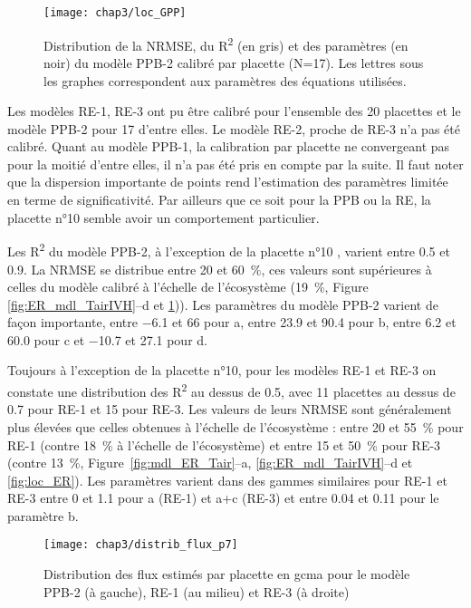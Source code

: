 \begin{figure}
\centering
\texttt{[image: chap3/loc\_GPP]}
\caption{Distribution de la NRMSE, du R\textsuperscript{2} (en gris) et des paramètres (en noir) du modèle PPB-2 calibré par placette (N=17). Les lettres sous les graphes correspondent aux paramètres des équations utilisées.}
\label{fig:loc_GPP}
\end{figure}

Les modèles RE-1, RE-3 ont pu être calibré pour l'ensemble des 20 placettes et le modèle PPB-2 pour 17 d'entre elles.
Le modèle RE-2, proche de RE-3 n'a pas été calibré.
Quant au modèle PPB-1, la calibration par placette ne convergeant pas pour la moitié d'entre elles, il n'a pas été pris en compte par la suite.
Il faut noter que la dispersion importante de points rend l'estimation des paramètres limitée en terme de significativité.
Par ailleurs que ce soit pour la PPB ou la RE, la placette n°10 semble avoir un comportement particulier.


Les R\textsuperscript{2} du modèle PPB-2, à l'exception de la placette n°10 , varient entre \num{0.5} et \num{0.9}.
La NRMSE se distribue entre 20 et \SI{60}{\percent}, ces valeurs sont supérieures à celles du modèle calibré à l'échelle de l'écosystème (\SI{19}{\percent}, Figure~ \ref{fig:ER_mdl_TairIVH}--d et \ref{fig:loc_GPP})).
Les paramètres du modèle PPB-2 varient de façon importante, entre \num{-6.1} et \num{66} pour a, entre \num{23.9} et \num{90.4} pour b, entre \num{6.2} et \num{60.0} pour c et \num{-10.7} et \num{27.1} pour d.

Toujours à l'exception de la placette n°10, pour les modèles RE-1 et RE-3 on constate une distribution des R\textsuperscript{2} au dessus de \num{0.5}, avec 11 placettes au dessus de \num{0.7} pour RE-1 et 15 pour RE-3.
Les valeurs de leurs NRMSE sont généralement plus élevées que celles obtenues à l'échelle de l'écosystème : entre 20 et \SI{55}{\percent} pour RE-1 (contre \SI{18}{\percent} à l'échelle de l'écosystème) et entre 15 et \SI{50}{\percent} pour RE-3 (contre \SI{13}{\percent}, Figure~\ref{fig:mdl_ER_Tair}--a, \ref{fig:ER_mdl_TairIVH}--d et \ref{fig:loc_ER}).
Les paramètres varient dans des gammes similaires pour RE-1 et RE-3 entre 0 et \num{1.1} pour a (RE-1) et a+c (RE-3) et entre \num{0.04} et \num{0.11} pour le paramètre b.


\begin{figure}
\centering
\texttt{[image: chap3/distrib\_flux\_p7]}
\caption{Distribution des flux estimés par placette en \si{gcma} pour le modèle PPB-2 (à gauche), RE-1 (au milieu) et RE-3 (à droite)}
\label{fig:distrib_fl_p7}
\end{figure}


